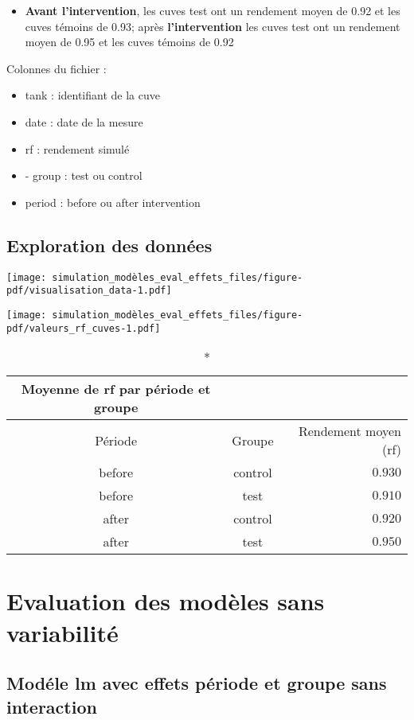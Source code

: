 \documentclass[
  letterpaper,
  DIV=11,
  numbers=noendperiod]{scrartcl}
\providecommand{\tightlist}{%
  \setlength{\itemsep}{0pt}\setlength{\parskip}{0pt}}\usepackage{longtable,booktabs,array}
\begin{document}
\begin{itemize}
\tightlist
\item
  \textbf{Avant l'intervention}, les cuves test ont un rendement moyen
  de 0.92 et les cuves témoins de 0.93; après \textbf{l'intervention}
  les cuves test ont un rendement moyen de 0.95 et les cuves témoins de
  0.92
\end{itemize}

Colonnes du fichier :

\begin{itemize}
\item
  tank : identifiant de la cuve
\item
  date : date de la mesure
\item
  rf : rendement simulé
\item
  - group : test ou control
\item
  period : before ou after intervention
\end{itemize}

\subsection{Exploration des données}\label{exploration-des-donnuxe9es}

\texttt{[image: simulation\_modèles\_eval\_effets\_files/figure-pdf/visualisation\_data-1.pdf]}

\texttt{[image: simulation\_modèles\_eval\_effets\_files/figure-pdf/valeurs\_rf\_cuves-1.pdf]}

\begin{longtable*}{ccr}
\caption*{
{\large Moyenne de rf par période et groupe}
} \\ 
\toprule
Période & Groupe & Rendement moyen (rf) \\ 
\midrule\addlinespace[2.5pt]
before & control & $0.930$ \\ 
before & test & $0.910$ \\ 
after & control & $0.920$ \\ 
after & test & $0.950$ \\ 
\bottomrule
\end{longtable*}

\section{Evaluation des modèles sans
variabilité}\label{evaluation-des-moduxe8les-sans-variabilituxe9}

\subsection{Modéle lm avec effets période et groupe sans
interaction}\label{moduxe9le-lm-avec-effets-puxe9riode-et-groupe-sans-interaction}
\end{document}
